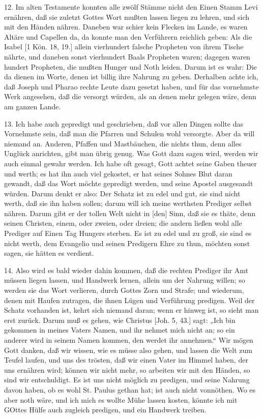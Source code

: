12. Im alten Testamente konnten alle zwölf Stämme nicht den Einen Stamm Levi ernähren, daß sie zuletzt Gottes Wort mußten lassen liegen zu lehren, und sich mit den Händen nähren. Daneben war schier kein Flecken im Lande, es waren Altäre und Capellen da, da konnte man den Verführern reichlich geben: Als die Isabel [1 Kön. 18, 19.] allein vierhundert falsche Propheten von ihrem Tische nährte, und daneben sonst vierhundert Baals Propheten waren; dagegen waren hundert Propheten, die mußten Hunger und Noth leiden. Darum ist es wahr: Die da dienen im Worte, denen ist billig ihre Nahrung zu geben. Derhalben achte ich, daß Joseph und Pharao rechte Leute dazu gesetzt haben, und für das vornehmste Werk angesehen, daß die versorgt würden, als an denen mehr gelegen wäre, denn am ganzen Lande.

13. Ich habe auch gepredigt und geschrieben, daß vor allen Dingen sollte das Vornehmste sein, daß man die Pfarren und Schulen wohl versorgte. Aber da will niemand an. Anderen, Pfaffen und Mastbäuchen, die nichts thun, denn alles Unglück anrichten, gibt man übrig genug. Was Gott dazu sagen wird, werden wir auch einmal gewahr werden. Ich habe oft gesagt, Gott achtet seine Gaben theuer und werth; es hat ihn auch viel gekostet, er hat seines Sohnes Blut daran gewandt, daß das Wort möchte gepredigt werden, und seine Apostel ausgesandt würden. Darum denkt er also: Der Schatz ist zu edel und gut, sie sind nicht werth, daß sie ihn haben sollen; darum will ich meine werthsten Prediger selbst nähren. Darum gibt er der tollen Welt nicht in [den] Sinn, daß sie es thäte, denn seinen Christen, einem, oder zweien, oder dreien; die andern ließen wohl alle Prediger auf Einen Tag Hungers sterben. Es ist zu edel und zu groß, sie sind es nicht werth, dem Evangelio und seinen Predigern Ehre zu thun, möchten sonst sagen, sie hätten es verdient.

14. Also wird es bald wieder dahin kommen, daß die rechten Prediger ihr Amt müssen liegen lassen, und Handwerk lernen, allein um der Nahrung willen; so werden sie das Wort verlieren, durch Gottes Zorn und Strafe; und wiederum, denen mit Haufen zutragen, die ihnen Lügen und Verführung predigen. Weil der Schatz vorhanden ist, kehrt sich niemand daran; wenn er hinweg ist, so sieht man erst zurück. Darum muß es gehen, wie Christus [Joh. 5, 43.] sagt: „Ich bin gekommen in meines Vaters Namen, und ihr nehmet mich nicht an; so ein anderer wird in seinem Namen kommen, den werdet ihr annehmen.“ Wir mögen Gott danken, daß wir wissen, wie es müsse also gehen, und lassen die Welt zum Teufel laufen, und uns des trösten, daß wir einen Vater im Himmel haben, der uns ernähren wird; können wir nicht mehr, so arbeiten wir mit den Händen, so sind wir entschuldigt. Es ist uns nicht möglich
zu predigen, und seine Nahrung davon haben, ob es wohl St. Paulus gethan hat; ist auch nicht vonnöthen. Wo es aber noth wäre, und ich mich es wollte Mühe lassen kosten, könnte ich mit GOttes Hülfe auch zugleich predigen, und ein Handwerk treiben.


